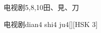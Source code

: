 \begin{entry}{电视剧}{5,8,10}{⽥、⾒、⼑}
  \begin{phonetics}{电视剧}{dian4 shi4 ju4}[][HSK 3]
  \end{phonetics}
\end{entry}
